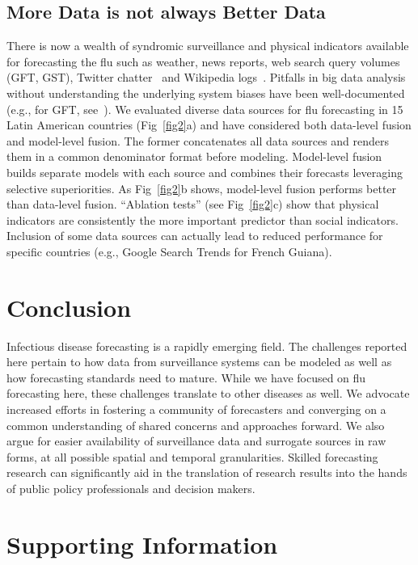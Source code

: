 \documentclass[10pt,letterpaper]{article}
\begin{document}
\subsection*{More Data is not always Better Data}
There is now a wealth of syndromic surveillance and physical indicators
available for forecasting the flu such as weather, news reports, web search
query volumes (GFT, GST), Twitter chatter~\cite{chakraborty2014forecasting} and
Wikipedia logs~\cite{mciver2014wikipedia,hickman2015wikipedia}.  Pitfalls in
big data analysis without understanding the underlying system biases have been
well-documented (e.g., for GFT, see~\cite{lazer2014parable}).  We evaluated
diverse data sources for flu forecasting in 15 Latin American countries
(Fig~\ref{fig2}a) and have considered both data-level fusion and model-level
fusion. The former concatenates all data sources and renders them in a common
denominator format before modeling. Model-level fusion builds separate models
with each source and combines their forecasts leveraging selective
superiorities. As Fig~\ref{fig2}b shows, model-level fusion performs better
than data-level fusion. “Ablation tests” (see Fig~\ref{fig2}c) show that
physical indicators are consistently the more important predictor than social
indicators. Inclusion of some data sources can actually lead to reduced
performance for specific countries (e.g., Google Search Trends for French
Guiana).

\section*{Conclusion}
Infectious disease forecasting is a rapidly emerging field. The challenges
reported here pertain to how data from surveillance systems can be modeled as
well as how forecasting standards need to mature. While we have focused on flu
forecasting here, these challenges translate to other diseases as well. We
advocate increased efforts in fostering a community of forecasters and
converging on a common understanding of shared concerns and approaches forward.
We also argue for easier availability of surveillance data and surrogate
sources in raw forms, at all possible spatial and temporal granularities.
Skilled forecasting research can significantly aid in the translation of
research results into the hands of public policy professionals and decision
makers.

\iffalse
\section*{Supporting Information}
\end{document}
